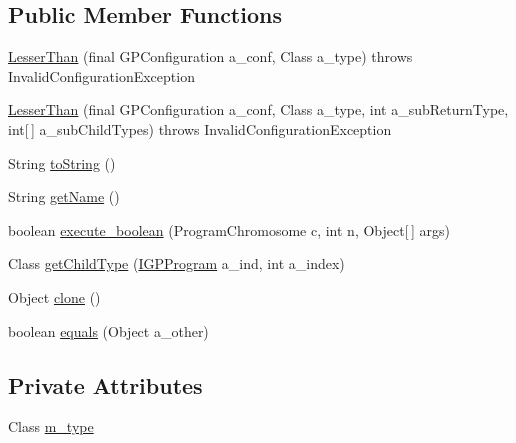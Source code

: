\subsection*{Public Member Functions}
\begin{DoxyCompactItemize}
\item 
\hyperlink{classorg_1_1jgap_1_1gp_1_1function_1_1_lesser_than_ac7dc557869b1cfb4c076953b825132e3}{Lesser\-Than} (final G\-P\-Configuration a\-\_\-conf, Class a\-\_\-type)  throws Invalid\-Configuration\-Exception 
\item 
\hyperlink{classorg_1_1jgap_1_1gp_1_1function_1_1_lesser_than_a22c5bf5d89408fd5fe8003e370a91588}{Lesser\-Than} (final G\-P\-Configuration a\-\_\-conf, Class a\-\_\-type, int a\-\_\-sub\-Return\-Type, int\mbox{[}$\,$\mbox{]} a\-\_\-sub\-Child\-Types)  throws Invalid\-Configuration\-Exception 
\item 
String \hyperlink{classorg_1_1jgap_1_1gp_1_1function_1_1_lesser_than_a7e2611b885baa2b3cb3263620a020d11}{to\-String} ()
\item 
String \hyperlink{classorg_1_1jgap_1_1gp_1_1function_1_1_lesser_than_af835f40388104e671936421898db93d1}{get\-Name} ()
\item 
boolean \hyperlink{classorg_1_1jgap_1_1gp_1_1function_1_1_lesser_than_a14c2c00160d10ab0a0ced3d2bdc4acec}{execute\-\_\-boolean} (Program\-Chromosome c, int n, Object\mbox{[}$\,$\mbox{]} args)
\item 
Class \hyperlink{classorg_1_1jgap_1_1gp_1_1function_1_1_lesser_than_a47106c68c4a52b3202a2a9366643231f}{get\-Child\-Type} (\hyperlink{interfaceorg_1_1jgap_1_1gp_1_1_i_g_p_program}{I\-G\-P\-Program} a\-\_\-ind, int a\-\_\-index)
\item 
Object \hyperlink{classorg_1_1jgap_1_1gp_1_1function_1_1_lesser_than_a283593c6ae169e134630507c3416080c}{clone} ()
\item 
boolean \hyperlink{classorg_1_1jgap_1_1gp_1_1function_1_1_lesser_than_a871569cabc3a608cb09cbbbfb6ed6787}{equals} (Object a\-\_\-other)
\end{DoxyCompactItemize}
\subsection*{Private Attributes}
\begin{DoxyCompactItemize}
\item 
Class \hyperlink{classorg_1_1jgap_1_1gp_1_1function_1_1_lesser_than_abd38f56dcea7da03736d935b48a48d75}{m\-\_\-type}
\end{DoxyCompactItemize}
